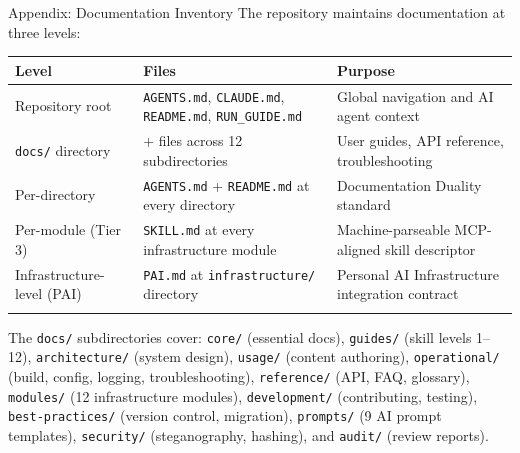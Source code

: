 \documentclass[
  ignorenonframetext,
]{beamer}
\author{\texorpdfstring{}{}}
\date{}
\newcounter{none} %
\begin{document}
\begin{frame}
\newpage
\end{frame}

\begin{frame}[fragile]{Appendix: Documentation Inventory}
\protect{}\label{appendix-docs}
The repository maintains documentation at three levels:

\begin{table}[h]
\caption{Documentation inventory across the four-layer documentation architecture, from repository-wide system files to per-module skill descriptors.}
\label{tab:documentation-inventory}
\end{table}

{\def\LTcaptype{none} %
\begin{longtable}[]{@{}
  >{\raggedright\arraybackslash}p{}
  >{\centering\arraybackslash}p{}
  >{\raggedright\arraybackslash}p{}@{}}
\toprule\noalign{}
\begin{minipage}[b]{\linewidth}\raggedright
Level
\end{minipage} & \begin{minipage}[b]{\linewidth}\centering
Files
\end{minipage} & \begin{minipage}[b]{\linewidth}\raggedright
Purpose
\end{minipage} \\
\midrule\noalign{}
\endhead
Repository root & \texttt{AGENTS.md}, \texttt{CLAUDE.md},
\texttt{README.md}, \texttt{RUN\_GUIDE.md} & Global navigation and AI
agent context \\
\texttt{docs/} directory & 90+ files across 12 subdirectories & User
guides, API reference, troubleshooting \\
Per-directory & \texttt{AGENTS.md} + \texttt{README.md} at every
directory & Documentation Duality standard \\
Per-module (Tier 3) & \texttt{SKILL.md} at every infrastructure module &
Machine-parseable MCP-aligned skill descriptor \\
Infrastructure-level (PAI) & \texttt{PAI.md} at \texttt{infrastructure/}
directory & Personal AI Infrastructure integration contract \\
\bottomrule\noalign{}
\end{longtable}
}

The \texttt{docs/} subdirectories cover: \texttt{core/} (essential
docs), \texttt{guides/} (skill levels 1--12), \texttt{architecture/}
(system design), \texttt{usage/} (content authoring),
\texttt{operational/} (build, config, logging, troubleshooting),
\texttt{reference/} (API, FAQ, glossary), \texttt{modules/} (12
infrastructure modules), \texttt{development/} (contributing, testing),
\texttt{best-practices/} (version control, migration), \texttt{prompts/}
(9 AI prompt templates), \texttt{security/} (steganography, hashing),
and \texttt{audit/} (review reports).
\end{frame}
\end{document}
